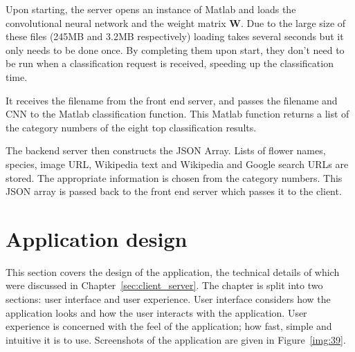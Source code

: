 \documentclass[11pt, a4paper]{report}
\newcommand{\vect}[1]{\boldsymbol{#1}}
\begin{document}
Upon starting, the server opens an instance of Matlab and loads the convolutional neural network and the weight matrix $\vect{W}$. Due to the large size of these files (245MB and 3.2MB respectively) loading takes several seconds but it only needs to be done once. By completing them upon start, they don't need to be run when a classification request is received, speeding up the classification time. 

It receives the filename from the front end server, and passes the filename and CNN to the Matlab classification function. This Matlab function returns a list of the category numbers of the eight top classification results. 

The backend server then constructs the JSON Array. Lists of flower names, species, image URL, Wikipedia text and Wikipedia and Google search URLs are stored. The appropriate information is chosen from the category numbers. This JSON array is passed back to the front end server which passes it to the client. 




\chapter{Application design}

This section covers the design of the application, the technical details of which were discussed in Chapter~\ref{sec:client_server}. The chapter is split into two sections: user interface and user experience. User interface considers how the application looks and how the user interacts with the application. User experience is concerned with the feel of the application; how fast, simple and intuitive it is to use. Screenshots of the application are given in Figure~\ref{img:39}.
\end{document}
